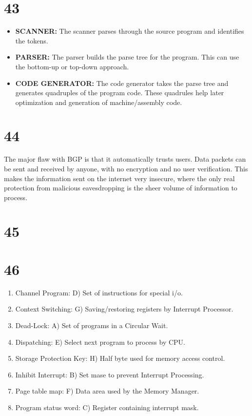 \documentclass[a4paper,11pt]{article}
\begin{document}

\section*{43}
\begin{itemize}
  \item {\bf SCANNER:}  The scanner parses through the source program and identifies the tokens. 
  \item {\bf PARSER:} The parser builds the parse tree for the program.  This can use the bottom-up or top-down approach.
  \item {\bf CODE GENERATOR:} The code generator takes the parse tree and generates quadruples of the program code.  These quadrules help later optimization and generation of machine/assembly code.
\end{itemize}



\section*{44}
The major flaw with BGP is that it automatically trusts users.  Data packets can be sent and received by anyone, with no encryption and no user verification.  This makes the information sent on the internet very insecure, where the only real protection from malicious eavesdropping is the sheer volume of information to process.



\section*{45}


\section*{46}
\begin{enumerate}
  \item Channel Program: D) Set of instructions for special i/o.
  \item Context Switching: G) Saving/restoring registers by Interrupt Processor.
  \item Dead-Lock:  A) Set of programs in a Circular Wait.
  \item Dispatching:  E) Select next program to process by CPU.
  \item Storage Protection Key:  H) Half byte used for memory access control.
  \item Inhibit Interrupt:  B) Set mase to prevent Interrupt Processing.
  \item Page table map:  F) Data area used by the Memory Manager.
  \item Program status word:  C) Register containing interrupt mask.
\end{enumerate}
\end{document}
